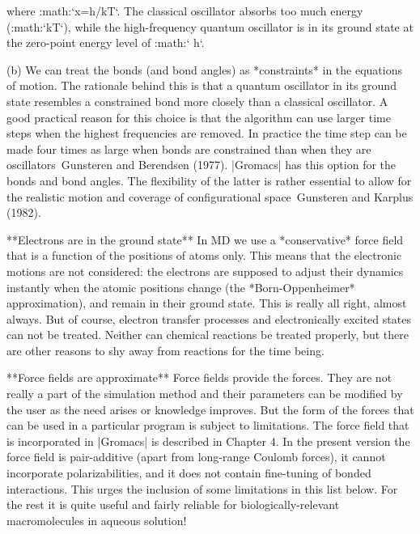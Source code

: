             where :math:`x=h\nu /kT`. The classical oscillator absorbs too
            much energy (:math:`kT`), while the high-frequency quantum
            oscillator is in its ground state at the zero-point energy level
            of :math:` h\nu`.

      (b)   We can treat the bonds (and bond angles) as
            *constraints* in the equations of
            motion. The rationale behind this is that a quantum oscillator in
            its ground state resembles a constrained bond more closely than a
            classical oscillator. A good practical reason for this choice is
            that the algorithm can use larger time steps when the highest
            frequencies are removed. In practice the time step can be made
            four times as large when bonds are constrained than when they are
            oscillators Gunsteren and Berendsen (1977). |Gromacs| has this
            option for the bonds and bond angles. The flexibility of the
            latter is rather essential to allow for the realistic motion and
            coverage of configurational space Gunsteren and Karplus (1982).

**Electrons are in the ground state**
      In MD we use a *conservative* force field that is a function of
      the positions of atoms only. This means that the electronic
      motions are not considered: the electrons are supposed to adjust
      their dynamics instantly when the atomic positions change (the
      *Born-Oppenheimer*
      approximation), and remain in their ground state. This is really
      all right, almost always. But of course, electron transfer
      processes and electronically excited states can not be treated.
      Neither can chemical reactions be treated properly, but there are
      other reasons to shy away from reactions for the time being.

**Force fields are approximate**
      Force fields
      provide the forces.
      They are not really a part of the simulation method and their
      parameters can be modified by the user as the need arises or
      knowledge improves. But the form of the forces that can be used in
      a particular program is subject to limitations. The force field
      that is incorporated in |Gromacs| is described in Chapter 4. In the
      present version the force field is pair-additive (apart from
      long-range Coulomb forces), it cannot incorporate
      polarizabilities, and it does not contain fine-tuning of bonded
      interactions. This urges the inclusion of some limitations in this
      list below. For the rest it is quite useful and fairly reliable
      for biologically-relevant macromolecules in aqueous solution!

